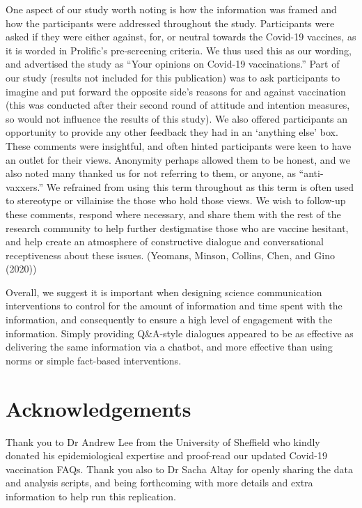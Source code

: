 \documentclass[
  english,
  ,jou,floatsintext]{apa6}
\begin{document}
One aspect of our study worth noting is how the information was framed and how the participants were addressed throughout the study. Participants were asked if they were either against, for, or neutral towards the Covid-19 vaccines, as it is worded in Prolific's pre-screening criteria. We thus used this as our wording, and advertised the study as ``Your opinions on Covid-19 vaccinations.'' Part of our study (results not included for this publication) was to ask participants to imagine and put forward the opposite side's reasons for and against vaccination (this was conducted after their second round of attitude and intention measures, so would not influence the results of this study). We also offered participants an opportunity to provide any other feedback they had in an `anything else' box. These comments were insightful, and often hinted participants were keen to have an outlet for their views. Anonymity perhaps allowed them to be honest, and we also noted many thanked us for not referring to them, or anyone, as ``anti-vaxxers.'' We refrained from using this term throughout as this term is often used to stereotype or villainise the those who hold those views. We wish to follow-up these comments, respond where necessary, and share them with the rest of the research community to help further destigmatise those who are vaccine hesitant, and help create an atmosphere of constructive dialogue and conversational receptiveness about these issues. (Yeomans, Minson, Collins, Chen, and Gino (2020))

Overall, we suggest it is important when designing science communication interventions to control for the amount of information and time spent with the information, and consequently to ensure a high level of engagement with the information. Simply providing Q\&A-style dialogues appeared to be as effective as delivering the same information via a chatbot, and more effective than using norms or simple fact-based interventions.

\hypertarget{acknowledgements}{%
\section{Acknowledgements}\label{acknowledgements}}

Thank you to Dr Andrew Lee from the University of Sheffield who kindly donated his epidemiological expertise and proof-read our updated Covid-19 vaccination FAQs.
Thank you also to Dr Sacha Altay for openly sharing the data and analysis scripts, and being forthcoming with more details and extra information to help run this replication.
\end{document}

